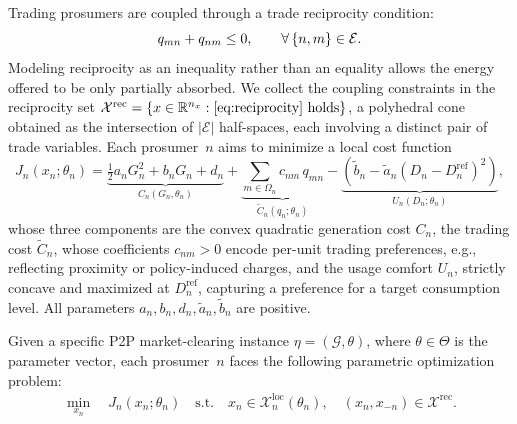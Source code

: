 \documentclass[final]{l4dc2026}
\begin{document}
Trading prosumers are coupled through a trade reciprocity condition:
\begin{equation}\label{eq:reciprocity}
  q_{mn} + q_{nm} \leq 0,
  \qquad \forall\, \{n,m\} \in \mathcal{E}.
  \vspace{-0.2cm}
\end{equation}
Modeling reciprocity as an inequality rather than an equality allows the energy offered to be only partially absorbed. We collect the coupling constraints in the reciprocity set $\mathcal{X}^{\mathrm{rec}} =
 \{x \in\mathbb{R}^{n_x}: \eqref{eq:reciprocity} \text{ holds}\}$, a polyhedral cone obtained as the
intersection of $|\mathcal{E}|$ half-spaces, each involving a distinct pair of
trade variables.
Each prosumer~$n$ aims to minimize a local cost function
\begin{equation}\label{eq:cost}
J_n(x_n; \theta_n) = \underbrace{\tfrac{1}{2} a_n G_n^2 + b_n G_n + d_n}_{C_n(G_n, \theta_n)} + \underbrace{{\textstyle\sum_{m \in \Omega_n}} c_{nm}\, q_{mn}}_{\tilde{C}_n(q_n; \theta_n)} - \underbrace{(\tilde{b}_n-\tilde{a}_n (D_n - D_n^{\text{ref}})^2)}_{U_n(D_n; \theta_n)},
\end{equation}
whose three components are the convex quadratic generation cost $C_n$, the trading cost $\tilde C_n$, whose coefficients $c_{nm}>0$ encode per-unit trading preferences, e.g., reflecting proximity or policy-induced charges, and the usage comfort $U_n$, strictly concave and maximized at $D_n^{\text{ref}}$, capturing a preference for a target consumption level. All parameters $a_n, b_n, d_n, \tilde{a}_n, \tilde{b}_n$ are positive.

Given a specific P2P market-clearing instance $\eta = (\mathcal{G}, \theta)$, where $\theta\in\Theta$ is the parameter vector, each prosumer~$n$ faces the following parametric optimization problem:
%
\begin{equation}\label{eq:game}
\begin{aligned}
   \min_{x_n}\quad  J_n(x_n; \theta_n) \quad
   \text{s.t.}\quad
    x_n \in \mathcal{X}_n^{\mathrm{\text{loc}}}(\theta_n), \quad (x_n,x_{-n}) \in \mathcal{X}^{\mathrm{rec}}.
\end{aligned}
\end{equation}
\end{document}
